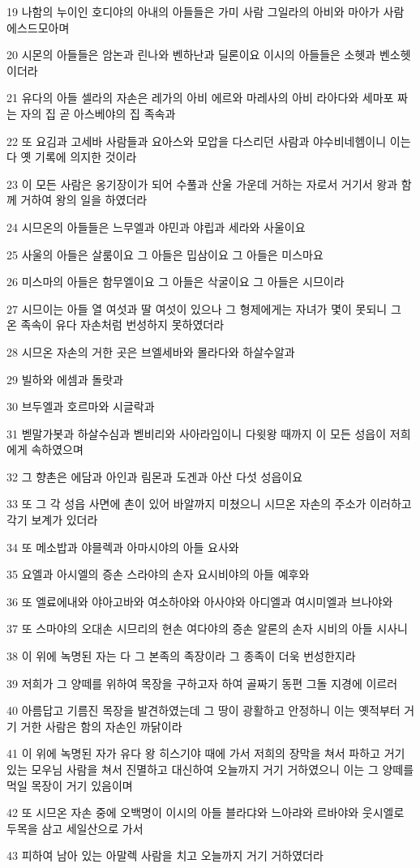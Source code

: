 \par 19 나함의 누이인 호디야의 아내의 아들들은 가미 사람 그일라의 아비와 마아가 사람 에스드모아며
\par 20 시몬의 아들들은 암논과 린나와 벤하난과 딜론이요 이시의 아들들은 소헷과 벤소헷이더라
\par 21 유다의 아들 셀라의 자손은 레가의 아비 에르와 마레사의 아비 라아다와 세마포 짜는 자의 집 곧 아스베야의 집 족속과
\par 22 또 요김과 고세바 사람들과 요아스와 모압을 다스리던 사람과 야수비네헴이니 이는 다 옛 기록에 의지한 것이라
\par 23 이 모든 사람은 옹기장이가 되어 수풀과 산울 가운데 거하는 자로서 거기서 왕과 함께 거하여 왕의 일을 하였더라
\par 24 시므온의 아들들은 느무엘과 야민과 야립과 세라와 사울이요
\par 25 사울의 아들은 살룸이요 그 아들은 밉삼이요 그 아들은 미스마요
\par 26 미스마의 아들은 함무엘이요 그 아들은 삭굴이요 그 아들은 시므이라
\par 27 시므이는 아들 열 여섯과 딸 여섯이 있으나 그 형제에게는 자녀가 몇이 못되니 그 온 족속이 유다 자손처럼 번성하지 못하였더라
\par 28 시므온 자손의 거한 곳은 브엘세바와 몰라다와 하살수알과
\par 29 빌하와 에셈과 돌랏과
\par 30 브두엘과 호르마와 시글락과
\par 31 벧말가봇과 하살수심과 벧비리와 사아라임이니 다윗왕 때까지 이 모든 성읍이 저희에게 속하였으며
\par 32 그 향촌은 에담과 아인과 림몬과 도겐과 아산 다섯 성읍이요
\par 33 또 그 각 성읍 사면에 촌이 있어 바알까지 미쳤으니 시므온 자손의 주소가 이러하고 각기 보계가 있더라
\par 34 또 메소밥과 야믈렉과 아마시야의 아들 요사와
\par 35 요엘과 아시엘의 증손 스라야의 손자 요시비야의 아들 예후와
\par 36 또 엘료에내와 야아고바와 여소하야와 아사야와 아디엘과 여시미엘과 브나야와
\par 37 또 스마야의 오대손 시므리의 현손 여다야의 증손 알론의 손자 시비의 아들 시사니
\par 38 이 위에 녹명된 자는 다 그 본족의 족장이라 그 종족이 더욱 번성한지라
\par 39 저희가 그 양떼를 위하여 목장을 구하고자 하여 골짜기 동편 그돌 지경에 이르러
\par 40 아름답고 기름진 목장을 발견하였는데 그 땅이 광활하고 안정하니 이는 옛적부터 거기 거한 사람은 함의 자손인 까닭이라
\par 41 이 위에 녹명된 자가 유다 왕 히스기야 때에 가서 저희의 장막을 쳐서 파하고 거기 있는 모우님 사람을 쳐서 진멸하고 대신하여 오늘까지 거기 거하였으니 이는 그 양떼를 먹일 목장이 거기 있음이며
\par 42 또 시므온 자손 중에 오백명이 이시의 아들 블라댜와 느아랴와 르바야와 웃시엘로 두목을 삼고 세일산으로 가서
\par 43 피하여 남아 있는 아말렉 사람을 치고 오늘까지 거기 거하였더라

